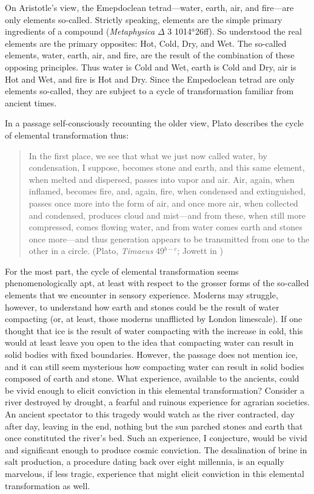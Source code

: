 On Aristotle's view, the Emepdoclean tetrad---water, earth, air, and fire---are only elements so-called. Strictly speaking, elements are the simple primary ingredients of a compound (\emph{Metaphysica} \( \Delta \) 3 1014\( ^{a} \)26ff). So understood the real elements are the primary opposites: Hot, Cold, Dry, and Wet. The so-called elements, water, earth, air, and fire, are the result of the combination of these opposing principles. Thus water is Cold and Wet, earth is Cold and Dry, air is Hot and Wet, and fire is Hot and Dry. Since the Empedoclean tetrad are only elements so-called, they are subject to a cycle of transformation familiar from ancient times. 

In a passage self-consciously recounting the older view, Plato describes the cycle of elemental transformation thus:
\begin{quote}
	In the first place, we see that what we just now called water, by condensation, I suppose, becomes stone and earth, and this same element, when melted and dispersed, passes into vapor and air. Air, again, when inflamed, becomes fire, and, again, fire, when condensed and extinguished, passes once more into the form of air, and once more air, when collected and condensed, produces cloud and mist---and from these, when still more compressed, comes flowing water, and from water comes earth and stones once more---and thus generation appears to be transmitted from one to the other in a circle. (Plato, \emph{Timaeus} 49\( ^{b-c} \); Jowett in \citealt[1176]{Hamilton:1989fk})
\end{quote}
For the most part, the cycle of elemental transformation seems phenomenologically apt, at least with respect to the grosser forms of the so-called elements that we encounter in sensory experience. Moderns may struggle, however, to understand how earth and stones could be the result of water compacting (or, at least, those moderns unafflicted by London limescale). If one thought that ice is the result of water compacting with the increase in cold, this would at least leave you open to the idea that compacting water can result in solid bodies with fixed boundaries. However, the passage does not mention ice, and it can still seem mysterious how compacting water can result in solid bodies composed of earth and stone. What experience, available to the ancients, could be vivid enough to elicit conviction in this elemental transformation? Consider a river destroyed by drought, a fearful and ruinous experience for agrarian societies. An ancient spectator to this tragedy would watch as the river contracted, day after day, leaving in the end, nothing but the sun parched stones and earth that once constituted the river's bed. Such an experience, I conjecture, would be vivid and significant enough to produce cosmic conviction. The desalination of brine in salt production, a procedure dating back over eight millennia, is an equally marvelous, if less tragic, experience that might elicit conviction in this elemental transformation as well.

